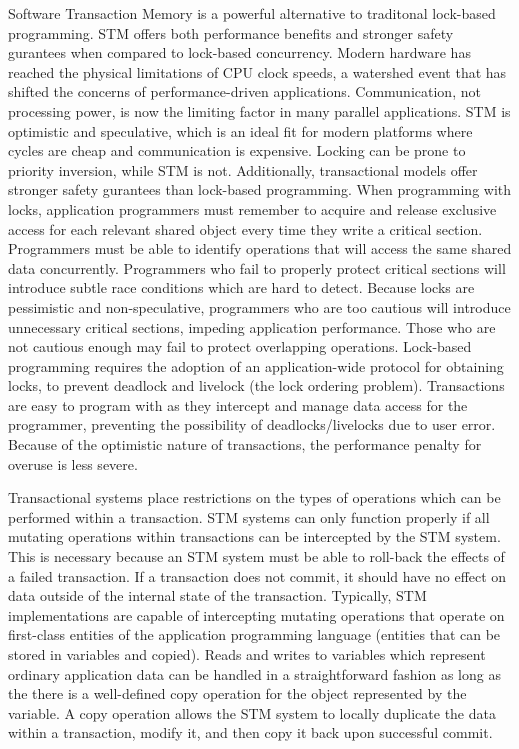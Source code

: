 \documentclass[conference]{IEEEtran}
\begin{document}
Software Transaction Memory is a powerful alternative to traditonal lock-based programming. STM offers both performance benefits and stronger safety gurantees when compared to lock-based concurrency. Modern hardware has reached the physical limitations of CPU clock speeds, a watershed event that has shifted the concerns of performance-driven applications. Communication, not processing power, is now the limiting factor in many parallel applications. STM is optimistic and speculative, which is an ideal fit for modern platforms where cycles are cheap and communication is expensive. Locking can be prone to priority inversion, while STM is not. Additionally, transactional models offer stronger safety gurantees than lock-based programming. When programming with locks, application programmers must remember to acquire and release exclusive access for each relevant shared object every time they write a critical section. Programmers must be able to identify operations that will access the same shared data concurrently. Programmers who fail to properly protect critical sections will introduce subtle race conditions which are hard to detect. Because locks are pessimistic and non-speculative, programmers who are too cautious will introduce unnecessary critical sections, impeding application performance. Those who are not cautious enough may fail to protect overlapping operations. Lock-based programming requires the adoption of an application-wide protocol for obtaining locks, to prevent deadlock and livelock (the lock ordering problem). Transactions are easy to program with as they intercept and manage data access for the programmer, preventing the possibility of deadlocks/livelocks due to user error. Because of the optimistic nature of transactions, the performance penalty for overuse is less severe. 

Transactional systems place restrictions on the types of operations which can be performed within a transaction. STM systems can only function properly if all mutating operations within transactions can be intercepted by the STM system. This is necessary because an STM system must be able to roll-back the effects of a failed transaction. If a transaction does not commit, it should have no effect on data outside of the internal state of the transaction. Typically, STM implementations are capable of intercepting mutating operations that operate on first-class entities of the application programming language (entities that can be stored in variables and copied). Reads and writes to variables which represent ordinary application data  can be handled in a straightforward fashion as long as the there is a well-defined copy operation for the object represented by the variable. A copy operation allows the STM system to locally duplicate the data within a transaction, modify it, and then copy it back upon successful commit.
\end{document}
